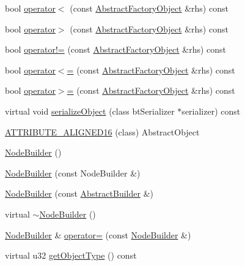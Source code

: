 \begin{DoxyCompactItemize}
\item 
bool \hyperlink{namespacejli_a5c433a85502a8c96877ad59022bf1024}{operator$<$} (const \hyperlink{namespacejli_aee55f3bcfb22fdfec10eadeec1618fec}{Abstract\+Factory\+Object} \&rhs) const 
\item 
bool \hyperlink{namespacejli_a41c55cdd32eb0bf43523ae6215185fcf}{operator$>$} (const \hyperlink{namespacejli_aee55f3bcfb22fdfec10eadeec1618fec}{Abstract\+Factory\+Object} \&rhs) const 
\item 
bool \hyperlink{namespacejli_a785b4d4ce01e29508a7d7a9170f828a9}{operator!=} (const \hyperlink{namespacejli_aee55f3bcfb22fdfec10eadeec1618fec}{Abstract\+Factory\+Object} \&rhs) const 
\item 
bool \hyperlink{namespacejli_a53a743e411edf86856cbb4ce21a6939d}{operator$<$=} (const \hyperlink{namespacejli_aee55f3bcfb22fdfec10eadeec1618fec}{Abstract\+Factory\+Object} \&rhs) const 
\item 
bool \hyperlink{namespacejli_a4c2ff4664aaa419bc99fe70d4dfb5694}{operator$>$=} (const \hyperlink{namespacejli_aee55f3bcfb22fdfec10eadeec1618fec}{Abstract\+Factory\+Object} \&rhs) const 
\item 
virtual void \hyperlink{namespacejli_a8e31f25cfa59439a2b75c8abd658fba7}{serialize\+Object} (class bt\+Serializer $\ast$serializer) const 
\item 
\hyperlink{namespacejli_a5cb9f42798ccca4b6de51fe827ade095}{A\+T\+T\+R\+I\+B\+U\+T\+E\+\_\+\+A\+L\+I\+G\+N\+E\+D16} (class) Abstract\+Object
\item 
\hyperlink{namespacejli_a1a43fda7f472452c5ded41130fe22e58}{Node\+Builder} ()
\item 
\hyperlink{namespacejli_a75dc0cad5c84f4d244d951b48255c6e4}{Node\+Builder} (const Node\+Builder \&)
\item 
\hyperlink{namespacejli_a3250e1d2e7ab6f0467839d9ff2f57dcb}{Node\+Builder} (const \hyperlink{classjli_1_1_abstract_builder}{Abstract\+Builder} \&)
\item 
virtual \hyperlink{namespacejli_ac5033296b7700d3610c8d224889de6c6}{$\sim$\+Node\+Builder} ()
\item 
\hyperlink{namespacejli_a1a43fda7f472452c5ded41130fe22e58}{Node\+Builder} \& \hyperlink{namespacejli_a290ea917337c90571eb741852c146180}{operator=} (const \hyperlink{namespacejli_a1a43fda7f472452c5ded41130fe22e58}{Node\+Builder} \&)
\item 
virtual u32 \hyperlink{namespacejli_ad74268a8f5493ee3df657a346cd64d30}{get\+Object\+Type} () const 
\item 

\end{DoxyCompactItemize}

